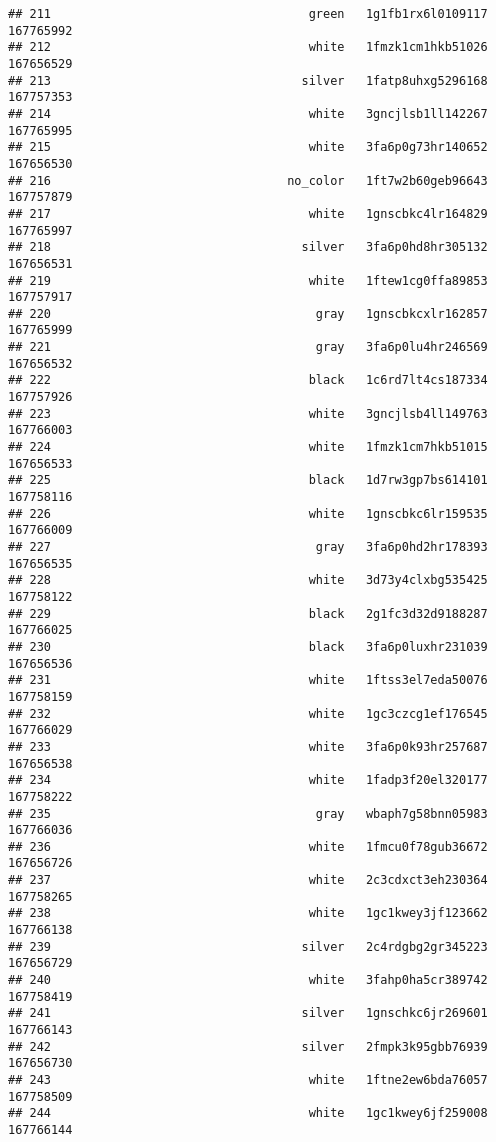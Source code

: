 \documentclass[
]{article}
\begin{document}
\begin{verbatim}
## 211                                    green   1g1fb1rx6l0109117 167765992
## 212                                    white   1fmzk1cm1hkb51026 167656529
## 213                                   silver   1fatp8uhxg5296168 167757353
## 214                                    white   3gncjlsb1ll142267 167765995
## 215                                    white   3fa6p0g73hr140652 167656530
## 216                                 no_color   1ft7w2b60geb96643 167757879
## 217                                    white   1gnscbkc4lr164829 167765997
## 218                                   silver   3fa6p0hd8hr305132 167656531
## 219                                    white   1ftew1cg0ffa89853 167757917
## 220                                     gray   1gnscbkcxlr162857 167765999
## 221                                     gray   3fa6p0lu4hr246569 167656532
## 222                                    black   1c6rd7lt4cs187334 167757926
## 223                                    white   3gncjlsb4ll149763 167766003
## 224                                    white   1fmzk1cm7hkb51015 167656533
## 225                                    black   1d7rw3gp7bs614101 167758116
## 226                                    white   1gnscbkc6lr159535 167766009
## 227                                     gray   3fa6p0hd2hr178393 167656535
## 228                                    white   3d73y4clxbg535425 167758122
## 229                                    black   2g1fc3d32d9188287 167766025
## 230                                    black   3fa6p0luxhr231039 167656536
## 231                                    white   1ftss3el7eda50076 167758159
## 232                                    white   1gc3czcg1ef176545 167766029
## 233                                    white   3fa6p0k93hr257687 167656538
## 234                                    white   1fadp3f20el320177 167758222
## 235                                     gray   wbaph7g58bnn05983 167766036
## 236                                    white   1fmcu0f78gub36672 167656726
## 237                                    white   2c3cdxct3eh230364 167758265
## 238                                    white   1gc1kwey3jf123662 167766138
## 239                                   silver   2c4rdgbg2gr345223 167656729
## 240                                    white   3fahp0ha5cr389742 167758419
## 241                                   silver   1gnschkc6jr269601 167766143
## 242                                   silver   2fmpk3k95gbb76939 167656730
## 243                                    white   1ftne2ew6bda76057 167758509
## 244                                    white   1gc1kwey6jf259008 167766144

\end{verbatim}
\end{document}

